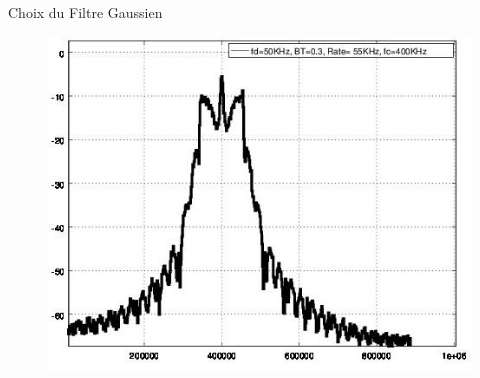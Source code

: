 \documentclass[8pt]{beamer}
\newcommand{\1}{\mathbbm 1}
\begin{document}
\begin{frame}{Choix du Filtre Gaussien}
{\begin{figure}
\includegraphics[scale=0.22]{figures/fig3.jpg} 
\end{figure}}

\end{frame}
\end{document}
